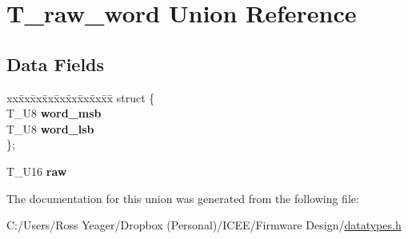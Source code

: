 \hypertarget{union_t__raw__word}{}\section{T\+\_\+raw\+\_\+word Union Reference}
\label{union_t__raw__word}
\subsection*{Data Fields}
\begin{DoxyCompactItemize}
\item 
\hypertarget{union_t__raw__word_aeab5dfbfb801776eadfef4b10209a5e5}{}\begin{tabbing}
xx\=xx\=xx\=xx\=xx\=xx\=xx\=xx\=xx\=\kill
struct \{\\
\>T\_U8 {\bfseries word\_msb}\\
\>T\_U8 {\bfseries word\_lsb}\\
\}; \label{union_t__raw__word_aeab5dfbfb801776eadfef4b10209a5e5}
\\

\end{tabbing}\item 
\hypertarget{union_t__raw__word_a96c3c22259fef71a02f88a1946bd7b24}{}T\+\_\+\+U16 {\bfseries raw}\label{union_t__raw__word_a96c3c22259fef71a02f88a1946bd7b24}

\end{DoxyCompactItemize}


The documentation for this union was generated from the following file\+:\begin{DoxyCompactItemize}
\item 
C\+:/\+Users/\+Ross Yeager/\+Dropbox (\+Personal)/\+I\+C\+E\+E/\+Firmware Design/\hyperlink{datatypes_8h}{datatypes.\+h}\end{DoxyCompactItemize}

